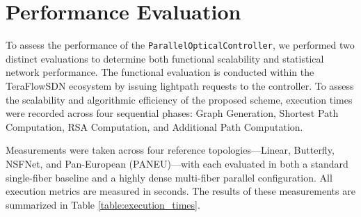 \documentclass[conference]{IEEEtran}
\begin{document}
\section{Performance Evaluation} %
To assess the performance of the \texttt{ParallelOpticalController}, we performed two distinct evaluations to determine both functional scalability and statistical network performance. The functional evaluation is conducted within the TeraFlowSDN ecosystem by issuing lightpath requests to the controller. To assess the scalability and algorithmic efficiency of the proposed scheme, execution times were recorded across four sequential phases: Graph Generation, Shortest Path Computation, RSA Computation, and Additional Path Computation.

Measurements were taken across four reference topologies—Linear, Butterfly, NSFNet, and Pan-European (PANEU)—with each evaluated in both a standard single-fiber baseline and a highly dense multi-fiber parallel configuration. All execution metrics are measured in seconds. The results of these measurements are summarized in Table \ref{table:execution_times}.
\end{document}

